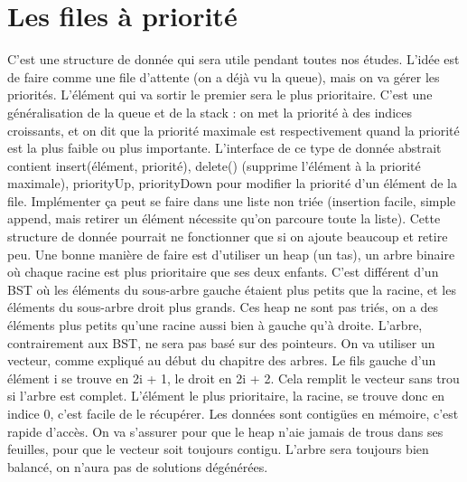 \documentclass[10pt]{article}
\begin{document}
\section{Les files à priorité}
C'est une structure de donnée qui sera utile pendant toutes nos études. L'idée est de faire comme une file d'attente (on a déjà vu la queue), mais on va gérer les priorités. L'élément qui va sortir le premier sera le plus prioritaire. C'est une généralisation de la queue et de la stack : on met la priorité à des indices croissants, et on dit que la priorité maximale est respectivement quand la priorité est la plus faible ou plus importante. 
\newline \newline 
L'interface de ce type de donnée abstrait contient insert(élément, priorité), delete() (supprime l'élément à la priorité maximale), priorityUp, priorityDown pour modifier la priorité d'un élément de la file. 
\newline \newline 
Implémenter ça peut se faire dans une liste non triée (insertion facile, simple append, mais retirer un élément nécessite qu'on parcoure toute la liste). Cette structure de donnée pourrait ne fonctionner que si on ajoute beaucoup et retire peu.  
\newline \newline 
Une bonne manière de faire est d'utiliser un heap (un tas), un arbre binaire où chaque racine est plus prioritaire que ses deux enfants. C'est différent d'un BST où les éléments du sous-arbre gauche étaient plus petits que la racine, et les éléments du sous-arbre droit plus grands. Ces heap ne sont pas triés, on a des éléments plus petits qu'une racine aussi bien à gauche qu'à droite. 
\newline \newline 
L'arbre, contrairement aux BST, ne sera pas basé sur des pointeurs. On va utiliser un vecteur, comme expliqué au début du chapitre des arbres. Le fils gauche d'un élément i se trouve en 2i + 1, le droit en 2i + 2. Cela remplit le vecteur sans trou si l'arbre est complet. 
\newline \newline 
L'élément le plus prioritaire, la racine, se trouve donc en indice 0, c'est facile de le récupérer. Les données sont contigües en mémoire, c'est rapide d'accès. On va s'assurer pour que le heap n'aie jamais de trous dans ses feuilles, pour que le vecteur soit toujours contigu. L'arbre sera toujours bien balancé, on n'aura pas de solutions dégénérées.  
\end{document}
